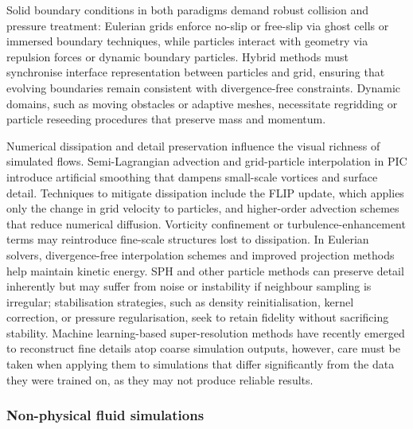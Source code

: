 Solid boundary conditions in both paradigms demand robust collision and pressure treatment: Eulerian grids enforce no-slip or free-slip via ghost cells or immersed boundary techniques, while particles interact with geometry via repulsion forces or dynamic boundary particles. Hybrid methods must synchronise interface representation between particles and grid, ensuring that evolving boundaries remain consistent with divergence-free constraints. Dynamic domains, such as moving obstacles or adaptive meshes, necessitate regridding or particle reseeding procedures that preserve mass and momentum.


Numerical dissipation and detail preservation influence the visual richness of simulated flows. Semi-Lagrangian advection and grid-particle interpolation in PIC introduce artificial smoothing that dampens small-scale vortices and surface detail. Techniques to mitigate dissipation include the FLIP update, which applies only the change in grid velocity to particles, and higher-order advection schemes that reduce numerical diffusion. Vorticity confinement or turbulence-enhancement terms may reintroduce fine-scale structures lost to dissipation. In Eulerian solvers, divergence-free interpolation schemes and improved projection methods help maintain kinetic energy. SPH and other particle methods can preserve detail inherently but may suffer from noise or instability if neighbour sampling is irregular; stabilisation strategies, such as density reinitialisation, kernel correction, or pressure regularisation, seek to retain fidelity without sacrificing stability. Machine learning-based super-resolution methods have recently emerged to reconstruct fine details atop coarse simulation outputs, however, care must be taken when applying them to simulations that differ significantly from the data they were trained on, as they may not produce reliable results.


\subsubsection{Non-physical fluid simulations}

    
